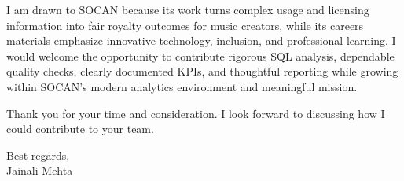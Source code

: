\documentclass[letterpaper,11pt]{article}
\begin{document}
\bigbreak
I am drawn to SOCAN because its work turns complex usage and licensing information into fair royalty outcomes for music creators, while its careers materials emphasize innovative technology, inclusion, and professional learning. I would welcome the opportunity to contribute rigorous SQL analysis, dependable quality checks, clearly documented KPIs, and thoughtful reporting while growing within SOCAN's modern analytics environment and meaningful mission.

\bigbreak
Thank you for your time and consideration. I look forward to discussing how I could contribute to your team.

\bigbreak
Best regards,\\
Jainali Mehta
\end{document}
